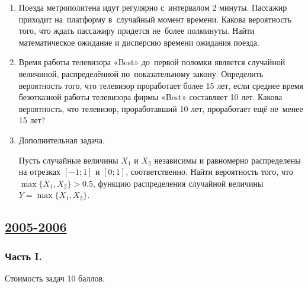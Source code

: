 \begin{enumerate}
\item Поезда метрополитена идут регулярно с~интервалом 2 минуты. Пассажир приходит
на~платформу в~случайный момент времени. Какова вероятность того, что ждать пассажиру
придется не~более полминуты. Найти математическое ожидание и дисперсию времени ожидания
поезда.

\item Время работы телевизора «Best» до~первой поломки является случайной величиной,
распределённой по~показательному закону. Определить вероятность того, что телевизор
проработает более 15 лет, если среднее время безотказной работы телевизора фирмы «Best»
составляет 10 лет. Какова вероятность, что телевизор, проработавший 10 лет, проработает
ещё не~менее 15 лет?

\item Дополнительная задача.

Пусть случайные величины $X_{1}$ и $X_{2}$ независимы и равномерно распределены
на отрезках $[-1;1]$ и $[0;1]$, соответственно. Найти вероятность того, что
$\max\{X_{1},X_{2}\}>0.5$, функцию распределения случайной величины
$Y=\max\{X_{1},X_{2}\}$.
\end{enumerate}



\newpage
\subsection[2005-2006]{\hyperref[sec:sol_kr_01_2005_2006]{2005-2006}}
\label{sec:kr_01_2005_2006}


\subsubsection*{Часть I.}

Стоимость задач 10 баллов.

